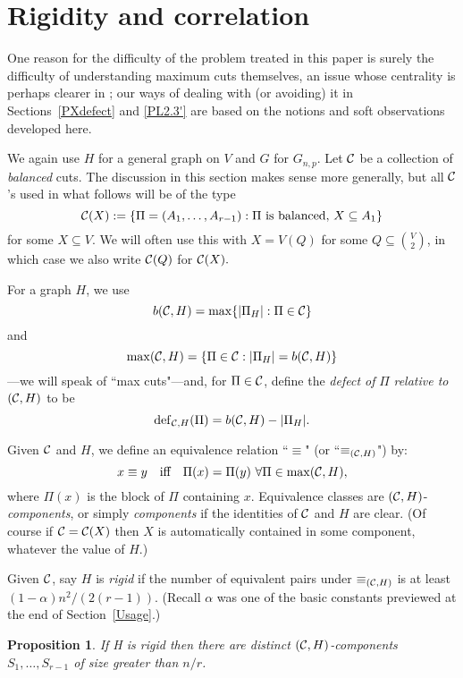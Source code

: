 \documentclass[letterpaper,11pt]{article}
\newtheorem{prop}[thm]{Proposition}
\newcommand{\beq}[1]{\begin{equation}\label{#1}}
\newcommand{\enq}[0]{\end{equation}}
\newcommand{\sub}[0]{\subseteq}
\renewcommand{\dots}[0]{,\ldots,}
\newcommand{\cee}[0]{{\cal C}}
\newcommand{\deff}[0]{{\rm def}}
\newcommand{\0}[0]{\emptyset}
\newcommand{\C}[2]{{{#1}\choose{{#2}}}}
\newcommand{\ga}[0]{\alpha }
\begin{document}
\section{Rigidity and correlation}\label{RandC}

One reason for the difficulty of the
problem treated in this paper is surely the difficulty
of understanding maximum cuts themselves,
an issue whose centrality is perhaps clearer in \cite{BPS};
our ways of dealing with (or avoiding) it
in Sections~\ref{PXdefect} and \ref{PL2.3'}
are based on the notions and soft observations developed here.


\medskip
We again
use $H$ for a general graph on $V$ and
$G$ for $G_{n,p}$.
%
Let $\cee$ be a collection of {\em balanced} cuts.
The discussion in this section makes sense more
generally,
but all $\cee$'s used in what follows will be
of the type
\beq{cee}
\cee(X) :=\{\Pi=(A_1\dots A_{r-1}):
\mbox{$\Pi$ is balanced, $X\sub A_1$}\}
\enq
for some $X\sub V$.
%
We will often use this with $X=V(Q)$ for some
$Q\sub \C{V}{2}$, in which case we also write
$\cee(Q) $ for $\cee(X).$





For a graph $H$, we use
\[b(\cee, H)= \max\{|\Pi_H|:\Pi\in \cee\}\]
and
\[\max(\cee,H)=\{\Pi\in \cee:
|\Pi_H|=b(\cee, H)\}\]
---we will speak of ``max cuts"---and, for $\Pi\in \cee$, define the {\em defect of}
$\Pi$ {\em relative to $(\cee,H)$}
to be
\[\deff_{\cee,H}(\Pi)= b(\cee, H)- |\Pi_H|.\]



\medskip
Given $\cee$
and $H$, we
define an equivalence relation
``$\equiv$" (or ``$\equiv_{(\cee,H)}$") by:
\[x\equiv y ~~~\mbox{iff}~~~
\Pi(x)=\Pi(y) ~\forall \Pi\in \max(\cee,H),\]
where $\Pi(x)$ is the block of $\Pi$
containing $x$.
Equivalence classes are
$(\cee,H)$-{\em components}, or simply
{\em components} if the identities of $\cee$ and $H$ are
clear.
(Of course if $\cee=\cee(X)$ then $X$ is automatically contained in
some component, whatever the value of $H$.)

Given $\cee$,
say
$H$ is {\em rigid}
if
the number of equivalent pairs under $\equiv_{(\cee,H)}$
is at least $(1-\ga)n^2/(2(r-1))$.
(Recall $\ga$ was one of the basic constants previewed at the end of Section~\ref{Usage}.)
%
\begin{prop}\label{Pcore}
If H is rigid then there are distinct $(\cee,H)$-components
$S_1\dots S_{r-1}$ of size greater than $n/r$.
\end{prop}
\end{document}
